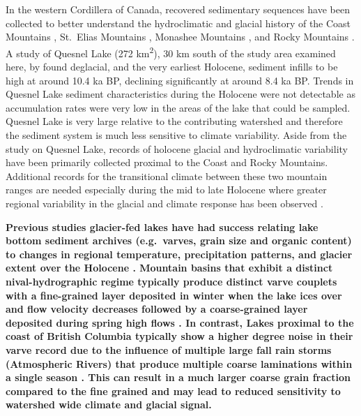 \documentclass[Royal,times,doublespace,sageh]{sagej}
\begin{document}
In the western Cordillera of Canada, recovered sedimentary sequences
have been collected to better understand the hydroclimatic and glacial
history of the Coast Mountains \citep{Menounos2008c}, St.~Elias
Mountains \citep{Crookshanks2008}, Monashee Mountains
\citep{Hodder2006b}, and Rocky Mountains
\citep{Leonard1986, Dirszowsky1997a, Desloges1999}. A study of Quesnel
Lake (272 km\textsuperscript{2}), 30 km south of the study area examined
here, by \citet{Gilbert2012} found deglacial, and the very earliest
Holocene, sediment infills to be high at around 10.4 ka BP, declining
significantly at around 8.4 ka BP. Trends in Quesnel Lake sediment
characteristics during the Holocene were not detectable as accumulation
rates were very low in the areas of the lake that could be sampled.
Quesnel Lake is very large relative to the contributing watershed and
therefore the sediment system is much less sensitive to climate
variability. Aside from the \citet{Gilbert2012} study on Quesnel Lake,
records of holocene glacial and hydroclimatic variability have been
primarily collected proximal to the Coast and Rocky Mountains.
Additional records for the transitional climate between these two
mountain ranges are needed especially during the mid to late Holocene
where greater regional variability in the glacial and climate response
has been observed \citep{Steinman2019, Menounos2009b}.

\textbf{Previous studies glacier-fed lakes have had success relating
lake bottom sediment archives (e.g.~varves, grain size and organic
content) to changes in regional temperature, precipitation patterns, and
glacier extent over the Holocene
\citep{Desloges1999, Hodder2006b, Leonard1997, Menounos2006b, Menounos2008c}.
Mountain basins that exhibit a distinct nival-hydrographic regime
typically produce distinct varve couplets with a fine-grained layer
deposited in winter when the lake ices over and flow velocity decreases
followed by a coarse-grained layer deposited during spring high flows
\citep[e.g.][]{Leonard1997, Hodder2007c, Desloges1999}. In contrast,
Lakes proximal to the coast of British Columbia typically show a higher
degree noise in their varve record due to the influence of multiple
large fall rain storms (Atmospheric Rivers) that produce multiple coarse
laminations within a single season
\citep[e.g.][]{Gilbert1997, Menounos2008c}. This can result in a much
larger coarse grain fraction compared to the fine grained and may lead
to reduced sensitivity to watershed wide climate and glacial signal.}
\end{document}

